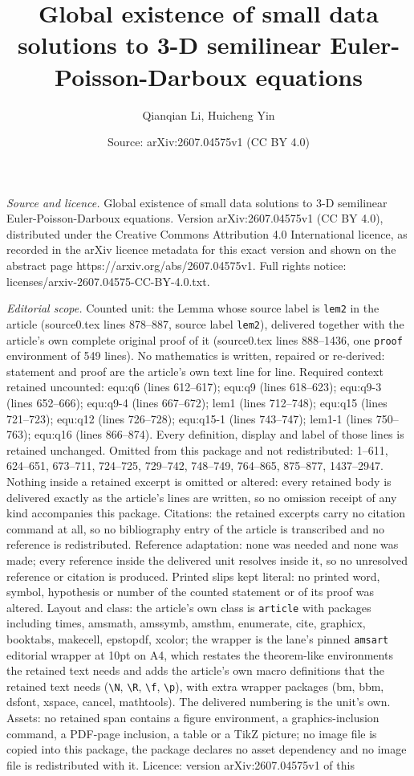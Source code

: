 \documentclass[10pt,a4paper]{amsart}
\title[Global existence of small data solutions to 3-D semilinear E]{Global existence of small data solutions to 3-D semilinear Euler-Poisson-Darboux equations}
\author{Qianqian Li, Huicheng Yin}
\date{Source: arXiv:2607.04575v1 (CC BY 4.0)}
\begin{document}
\maketitle

\noindent\emph{Source and licence.} Global existence of small data solutions to 3-D semilinear Euler-Poisson-Darboux equations. Version arXiv:2607.04575v1 (CC BY 4.0), distributed under the Creative Commons Attribution 4.0 International licence, as recorded in the arXiv licence metadata for this exact version and shown on the abstract page https://arxiv.org/abs/2607.04575v1. Full rights notice: licenses/arxiv-2607.04575-CC-BY-4.0.txt.\par\smallskip

\noindent\textit{Editorial scope.} Counted unit: the Lemma whose source label is \texttt{lem2} in the article (source0.tex lines 878--887, source label \texttt{lem2}), delivered together with the article's own complete original proof of it (source0.tex lines 888--1436, one \texttt{proof} environment of 549 lines). No mathematics is written, repaired or re-derived: statement and proof are the article's own text line for line. Required context retained uncounted: equ:q6 (lines 612--617); equ:q9 (lines 618--623); equ:q9-3 (lines 652--666); equ:q9-4 (lines 667--672); lem1 (lines 712--748); equ:q15 (lines 721--723); equ:q12 (lines 726--728); equ:q15-1 (lines 743--747); lem1-1 (lines 750--763); equ:q16 (lines 866--874). Every definition, display and label of those lines is retained unchanged. Omitted from this package and not redistributed: 1--611, 624--651, 673--711, 724--725, 729--742, 748--749, 764--865, 875--877, 1437--2947. Nothing inside a retained excerpt is omitted or altered: every retained body is delivered exactly as the article's lines are written, so no omission receipt of any kind accompanies this package. Citations: the retained excerpts carry no citation command at all, so no bibliography entry of the article is transcribed and no reference is redistributed. Reference adaptation: none was needed and none was made; every reference inside the delivered unit resolves inside it, so no unresolved reference or citation is produced. Printed slips kept literal: no printed word, symbol, hypothesis or number of the counted statement or of its proof was altered. Layout and class: the article's own class is \texttt{article} with packages including times, amsmath, amssymb, amsthm, enumerate, cite, graphicx, booktabs, makecell, epstopdf, xcolor; the wrapper is the lane's pinned \texttt{amsart} editorial wrapper at 10pt on A4, which restates the theorem-like environments the retained text needs and adds the article's own macro definitions that the retained text needs (\texttt{\textbackslash N}, \texttt{\textbackslash R}, \texttt{\textbackslash f}, \texttt{\textbackslash p}), with extra wrapper packages (bm, bbm, dsfont, xspace, cancel, mathtools). The delivered numbering is the unit's own. Assets: no retained span contains a figure environment, a graphics-inclusion command, a PDF-page inclusion, a table or a TikZ picture; no image file is copied into this package, the package declares no asset dependency and no image file is redistributed with it. Licence: version arXiv:2607.04575v1 of this 
\end{document}
